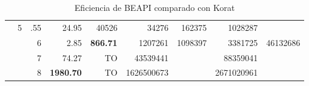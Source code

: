 \begin{table}[H]
\begin{center}
\begin{tabular}{clr|rr|rr|rr}
    &   5   &   .55     & 24.95	 & 40526 & 34276 & 162375   &1028287\\

&	&	6	&	2.85	& \textbf{866.71} &	1207261	& 1098397 &	3381725	&	46132686	\\
&	&	7	&	74.27	& TO &	43539441	& &	88359041 &		\\
&	&	8	&	\textbf{1980.70}	& TO &	1626500673	& &	2671020961	&		\\
\bottomrule

\end{tabular}%
\end{center}
\caption{Eficiencia de BEAPI comparado con Korat}

\label{table:korat-beapi}

\end{table}

 
